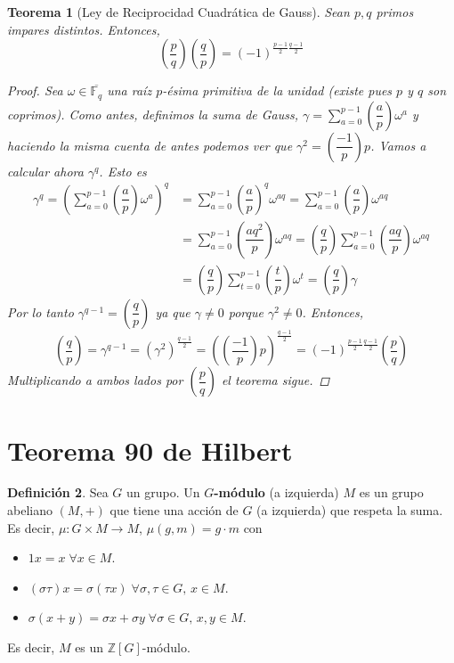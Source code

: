 \documentclass[12pt]{book}
\newtheorem{teo}{Teorema}[section]
\theoremstyle{definition}
\newtheorem{defn}[teo]{Definición}
\newcommand{\ZZ}{\mathbb{Z}}      %
\newcommand{\FF}{\mathbb{F}}
\begin{document}
\begin{teo}[Ley de Reciprocidad Cuadrática de Gauss] Sean $p,q$ primos impares distintos. Entonces, $$ \left(\dfrac{p}{q}\right)\left(\dfrac{q}{p}\right) = (-1)^{\frac{p-1}{2}\frac{q-1}{2}}$$
\begin{proof}
Sea $\omega\in\overline{\FF_q}$ una raíz $p$-ésima primitiva de la unidad (existe pues $p$ y $q$ son coprimos). Como antes, definimos la suma de Gauss, $\gamma = \displaystyle\sum_{a=0}^{p-1}\left(\dfrac{a}{p}\right)\omega^a$ y haciendo la misma cuenta de antes podemos ver que $\gamma^2 = \left(\dfrac{-1}{p}\right) p$. Vamos a calcular ahora $\gamma^q$. Esto es \begin{align*}\gamma^q = \left(\displaystyle\sum_{a=0}^{p-1}\left(\dfrac{a}{p}\right)\omega^a\right)^q &= \displaystyle\sum_{a=0}^{p-1}\left(\dfrac{a}{p}\right)^q \omega^{aq} = \displaystyle\sum_{a=0}^{p-1} \left(\dfrac{a}{p}\right) \omega^{aq} \\&=  \displaystyle\sum_{a=0}^{p-1} \left(\dfrac{aq^2}{p}\right) \omega^{aq} = \left(\dfrac{q}{p}\right)\displaystyle\sum_{a=0}^{p-1} \left(\dfrac{aq}{p}\right) \omega^{aq}\\ &= \left(\dfrac{q}{p}\right)\displaystyle\sum_{t=0}^{p-1} \left(\dfrac{t}{p}\right) \omega^{t} = \left(\dfrac{q}{p}\right) \gamma \end{align*} Por lo tanto $\gamma^{q-1} = \left(\dfrac{q}{p}\right)$ ya que $\gamma\neq 0$ porque $\gamma^2 \neq 0$. Entonces, $$\left(\dfrac{q}{p}\right) = \gamma^{q-1} = (\gamma^2)^{\frac{q-1}{2}} = \left( \left(\dfrac{-1}{p}\right)p\right)^{\frac{q-1}{2}} = (-1)^{\frac{p-1}{2}\frac{q-1}{2}} \left(\dfrac{p}{q}\right)$$ Multiplicando a ambos lados por $\left(\dfrac{p}{q}\right)$ el teorema sigue.
\end{proof}
\end{teo}

\section{Teorema 90 de Hilbert}

\begin{defn}
Sea $G$ un grupo. Un \textbf{$G$-módulo} (a izquierda) $M$ es un grupo abeliano $(M,+)$ que tiene una acción de $G$ (a izquierda) que respeta la suma. Es decir, $\mu:G\times M\to M$, $\mu(g,m)=g\cdot m$ con \begin{itemize}\item $1x = x\; \forall x\in M$. \item $(\sigma\tau) x = \sigma(\tau x) \; \forall \sigma,\tau\in G, \, x\in M$. \item $\sigma(x+y) = \sigma x + \sigma y\; \forall \sigma\in G,\, x,y\in M$. \end{itemize} Es decir, $M$ es un $\ZZ[G]$-módulo.
\end{defn}
\end{document}
